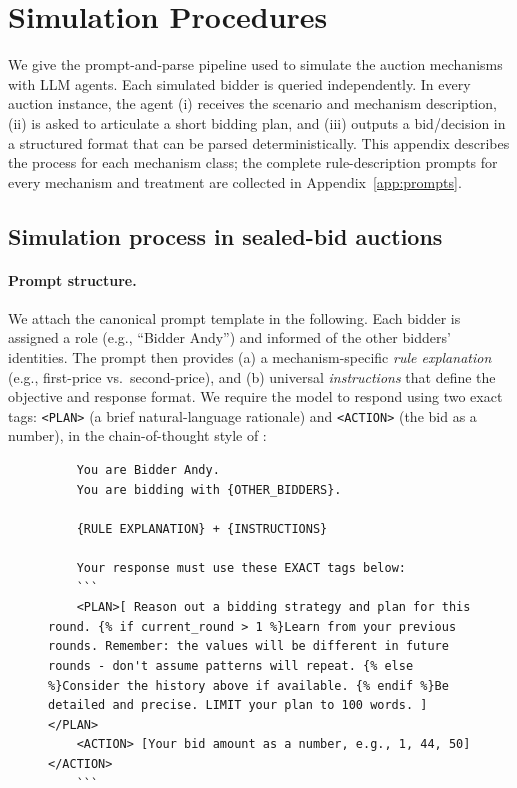 \section{Simulation Procedures}\label{app:procedures}

We give the prompt-and-parse pipeline used to simulate the auction mechanisms with LLM agents. Each simulated bidder is queried independently. In every auction instance, the agent (i) receives the scenario and mechanism description, (ii) is asked to articulate a short bidding plan, and (iii) outputs a bid/decision in a structured format that can be parsed deterministically. This appendix describes the process for each mechanism class; the complete rule-description prompts for every mechanism and treatment are collected in Appendix~\ref{app:prompts}.

\subsection{Simulation process in sealed-bid auctions}\label{app:sealed-process}

\paragraph{Prompt structure.}
We attach the canonical prompt template in the following. Each bidder is assigned a role (e.g., ``Bidder Andy'') and informed of the other bidders' identities. The prompt then provides (a) a mechanism-specific \emph{rule explanation} (e.g., first-price vs.\ second-price), and (b) universal \emph{instructions} that define the objective and response format. We require the model to respond using two exact tags: \verb|<PLAN>| (a brief natural-language rationale) and \verb|<ACTION>| (the bid as a number), in the chain-of-thought style of \citet{wei2022chain}:

\begin{figure}[H]
\centering
\begin{minipage}{0.95\textwidth}
\begin{lstlisting}
    You are Bidder Andy.
    You are bidding with {OTHER_BIDDERS}.

    {RULE EXPLANATION} + {INSTRUCTIONS}

    Your response must use these EXACT tags below:
    ```
    <PLAN>[ Reason out a bidding strategy and plan for this round. {% if current_round > 1 %}Learn from your previous rounds. Remember: the values will be different in future rounds - don't assume patterns will repeat. {% else %}Consider the history above if available. {% endif %}Be detailed and precise. LIMIT your plan to 100 words. ] </PLAN>
    <ACTION> [Your bid amount as a number, e.g., 1, 44, 50] </ACTION>
    ```
\end{lstlisting}
\end{minipage}
\end{figure}

